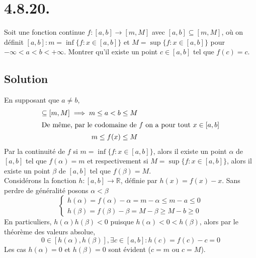 \section*{4.8.20.}
	Soit une fonction continue $f:[a,b]\longrightarrow [m,M]$ avec $[a,b]\subseteq[m,M]$, où on définit $[a,b] : m=\inf\{f:x\in[a,b]\}$ et $M=\sup\{f:x\in[a,b]\}$ pour $-\infty<a<b<+\infty$. Montrer qu'il existe un point $c\in [a,b]$ tel que $f(c)=c$.
\subsection*{Solution}
	En supposant que $a\neq b$,
	\begin{align}
		[a,b]\subseteq[m,M]\implies m\leq a < b \leq M\\
		\intertext{De même, par le codomaine de $f$ on a pour tout $x\in[a,b]$}
		m\leq f(x) \leq M	
	\end{align}
	Par la continuité de $f$ si $m=\inf\{f:x\in[a,b]\}$, alors il existe un point $\alpha $ de $[a,b]$ tel que $f(\alpha)=m$ et respectivement si $M=\sup\{f:x\in[a,b]\}$, alors il existe un point $\beta $ de $[a,b]$ tel que $f(\beta)=M$.\\
	Considérons la fonction $h:[a,b]\longrightarrow\mathbb{R}$, définie par $h(x)=f(x)-x$. Sans perdre de généralité posons $\alpha<\beta$
	\[
	\begin{cases}
	h(\alpha)=f(\alpha)-\alpha= m-\alpha\leq m - a\leq 0\\
	h(\beta)=f(\beta)-\beta= M-\beta\geq M - b\geq 0
	\end{cases}
	\]
	En particuliers, $h(\alpha)h(\beta)<0$ puisque $h(\alpha)<0<h(\beta)$, alors par le théorème des valeurs absolue, 
	\[0\in[h(\alpha),h(\beta)], \exists c\in [a,b] : h(c)=f(c)-c=0\]
	Les cas $h(\alpha)=0$ et $h(\beta)=0$ sont évident ($c=m$ ou $c=M$).
	